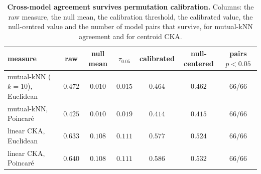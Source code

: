 \begin{table}[H]
\centering
\footnotesize
\setlength{\tabcolsep}{3pt}
\begin{tabular}{lcccccc}
\toprule
measure & raw & null mean & $\tau_{0.05}$ & calibrated & null-centered & pairs $p<0.05$ \\
\midrule
mutual-kNN ($k{=}10$), Euclidean & $0.472$ & $0.010$ & $0.015$ & $0.464$ & $0.462$ & 66/66 \\
mutual-kNN, Poincar\'e & $0.425$ & $0.010$ & $0.019$ & $0.414$ & $0.415$ & 66/66 \\
linear CKA, Euclidean & $0.633$ & $0.108$ & $0.111$ & $0.577$ & $0.524$ & 66/66 \\
linear CKA, Poincar\'e & $0.640$ & $0.108$ & $0.111$ & $0.586$ & $0.532$ & 66/66 \\
\bottomrule
\end{tabular}
\par\vspace{2pt}
\caption{\textbf{Cross-model agreement survives permutation calibration.} Columns: the raw measure, the null mean, the calibration threshold, the calibrated value, the null-centred value and the number of model pairs that survive, for mutual-kNN agreement and for centroid CKA.
}
\label{tab:q13-local}
\end{table}

